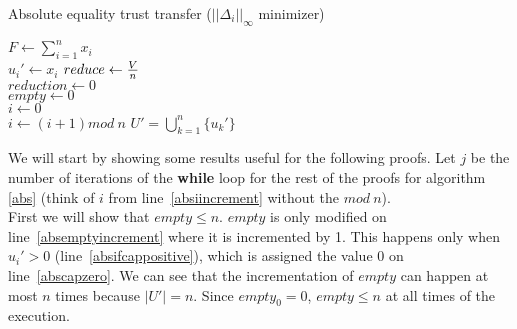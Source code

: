 \documentclass[11pt]{llncs}
\begin{document}
    \begin{algorithm}[H]
       \label{abs}
       \caption{Absolute equality trust transfer ($||\Delta_i||_\infty$ minimizer)}
       $F \gets \sum\limits_{i=1}^{n}x_i$ \\
          {$u_i' \gets x_i$ \label{abscapinit}}
       $reduce \gets {V \over n}$ \\
       $reduction \gets 0$ \\
       $empty \gets 0$ \\
       $i \gets 0$ \label{absiinit} \\
          {
           $i \gets (i + 1) mod \:n$ \label{absiincrement}}
       \Return $U' = \bigcup\limits_{k=1}^{n}\{u_k'\}$ \label{absreturn}
    \end{algorithm}
       \noindent
       We will start by showing some results useful for the following proofs. Let $j$ be the number of iterations of the
       \textbf{while} loop for the rest of the proofs for algorithm \ref{abs} (think of $i$ from line~\ref{absiincrement}
       without the $mod\:n$).\\
       First we will show that $empty \leq n$. $empty$ is only modified on line~\ref{absemptyincrement} where it is
       incremented by 1. This happens only when $u_i' > 0$ (line~\ref{absifcappositive}), which is assigned the value 0 on
       line~\ref{abscapzero}. We can see that the incrementation of $empty$ can happen at most $n$ times because
       $|U'| = n$. Since $empty_0 = 0$, $empty \leq n$ at all times of the execution. \\
\end{document}
